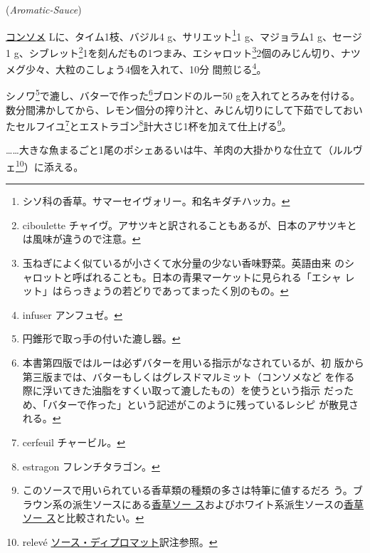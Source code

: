 \begin{recette}
\hspace{1em}(\emph{Aromatic-Sauce})



\protect\hyperlink{consomme-blanc}{コンソメ}\undemi{}
Lに、タイム1枝、バジル4 g、サリエット\footnote{シソ科の香草。サマーセイヴォリー。和名キダチハッカ。}1
g、マジョラム1 g、セージ1 g、シブレット\footnote{ciboulette
  チャイヴ。アサツキと訳されることもあるが、日本のアサツキとは風味が違うので注意。}1を刻んだもの1つまみ、エシャロット\footnote{玉ねぎによく似ているが小さくて水分量の少ない香味野菜。英語由来
  のシャロットと呼ばれることも。日本の青果マーケットに見られる「エシャ
  レット」はらっきょうの若どりであってまったく別のもの。}2個のみじん切り、ナツメグ少々、大粒のこしょう4個を入れて、10分
間煎じる\footnote{infuser アンフュゼ。}。

シノワ\footnote{円錐形で取っ手の付いた漉し器。}で漉し、バターで作った\footnote{本書第四版ではルーは必ずバターを用いる指示がなされているが、初
  版から第三版までは、バターもしくはグレスドマルミット（コンソメなど
  を作る際に浮いてきた油脂をすくい取って漉したもの）を使うという指示
  だっため、「バターで作った」という記述がこのように残っているレシピ
  が散見される。}ブロンドのルー50
gを入れてとろみを付ける。数分間沸かしてから、レモン\undemi{}個分の搾り汁と、みじん切りにして下茹でしておいたセルフイユ\footnote{cerfeuil
  チャービル。}とエストラゴン\footnote{estragon フレンチタラゴン。}計大さじ1杯を加えて仕上げる\footnote{このソースで用いられている香草類の種類の多さは特筆に値するだろ
  う。ブラウン系の派生ソースにある\protect\hyperlink{sauce-aux-fines-herbes}{香草ソー
  ス}およびホワイト系派生ソースの\protect\hyperlink{sauce-aux-fines-herbes-blanche}{香草ソー
  ス}と比較されたい。}。

\ldots{}\ldots{}大きな魚まるごと1尾のポシェあるいは牛、羊肉の大掛かりな仕立て（ルルヴェ\footnote{relevé
  \protect\hyperlink{sauce-diplomate}{ソース・ディプロマット}訳注参照。}）に添える。

\maeaki


\end{recette}
